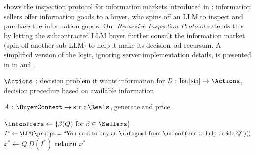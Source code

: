  shows the inspection protocol for information markets introduced in : information sellers offer information goods to a buyer, who spins off an LLM to inspect and purchase the information goods. Our \emph{Recursive Inspection Protocol} extends this by letting the subcontracted LLM buyer further consult the information market (spin off another sub-LLM) to help it make its decision, ad recursum. A simplified version of the logic, ignoring server implementation details, is presented in in  and .

\begin{algorithm}[tb]
\caption{One-level Inspection Protocol from }
\label{infonomy:alg:im}
\begin{algorithmic}

\Struct{\BuyerContext}
  \State $\Actions$ : decision problem it wants information for
  \State $D$ : $\operatorname{list}[\operatorname{str}]\to\Actions$, decision procedure based on available information
\EndStruct

\Struct{\Seller}
  \State $A$ : $\BuyerContext\to\operatorname{str}\times\Reals$, generate \InfoOffer{} and price
\EndStruct

\State{}
\State $\infooffers\gets \{\beta(Q)\text{ for }\beta\in\Sellers\}$
\State{}
\State $I^*\gets\LLM(\prompt=\text{``You need to buy an $\infogood$ from $\infooffers$ to help decide $Q$''})()$
\State{}
\State $x^*\gets Q.D(I^*)$
\State \textbf{return} $x^*$
\EndProcedure

\end{algorithmic}
\end{algorithm}


